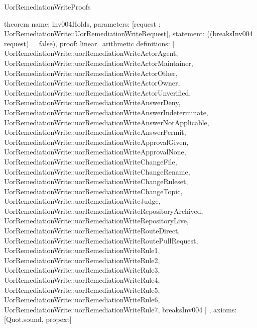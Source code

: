 \begin{lexlean}{UorRemediationWriteProofs}
\begin{semanticmodule}
theorem{
  name: inv004Holds,
  parameters: [request : UorRemediationWrite::UorRemediationWriteRequest],
  statement: ((breaksInv004 request) = false),
  proof: linear_arithmetic{
    definitions: [
      UorRemediationWrite::uorRemediationWriteActorAgent,
      UorRemediationWrite::uorRemediationWriteActorMaintainer,
      UorRemediationWrite::uorRemediationWriteActorOther,
      UorRemediationWrite::uorRemediationWriteActorOwner,
      UorRemediationWrite::uorRemediationWriteActorUnverified,
      UorRemediationWrite::uorRemediationWriteAnswerDeny,
      UorRemediationWrite::uorRemediationWriteAnswerIndeterminate,
      UorRemediationWrite::uorRemediationWriteAnswerNotApplicable,
      UorRemediationWrite::uorRemediationWriteAnswerPermit,
      UorRemediationWrite::uorRemediationWriteApprovalGiven,
      UorRemediationWrite::uorRemediationWriteApprovalNone,
      UorRemediationWrite::uorRemediationWriteChangeFile,
      UorRemediationWrite::uorRemediationWriteChangeRename,
      UorRemediationWrite::uorRemediationWriteChangeRuleset,
      UorRemediationWrite::uorRemediationWriteChangeTopic,
      UorRemediationWrite::uorRemediationWriteJudge,
      UorRemediationWrite::uorRemediationWriteRepositoryArchived,
      UorRemediationWrite::uorRemediationWriteRepositoryLive,
      UorRemediationWrite::uorRemediationWriteRouteDirect,
      UorRemediationWrite::uorRemediationWriteRoutePullRequest,
      UorRemediationWrite::uorRemediationWriteRule1,
      UorRemediationWrite::uorRemediationWriteRule2,
      UorRemediationWrite::uorRemediationWriteRule3,
      UorRemediationWrite::uorRemediationWriteRule4,
      UorRemediationWrite::uorRemediationWriteRule5,
      UorRemediationWrite::uorRemediationWriteRule6,
      UorRemediationWrite::uorRemediationWriteRule7,
      breaksInv004
    ]
  },
  axioms: [Quot.sound, propext]
}
\end{semanticmodule}
\end{lexlean}
